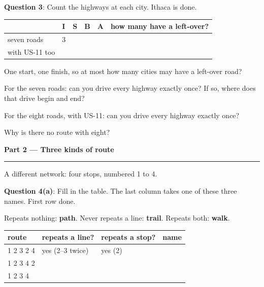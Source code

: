 \documentclass[a4paper, 14pt]{extarticle}
\newcommand{\parthead}[2]{%
  \vspace{0.6em}
  {\large\bfseries Part #1 --- #2}\par
  \vspace{-0.4em}\rule{\textwidth}{0.8pt}\par
  \vspace{0.2em}}
\begin{document}
\begin{minipage}{\textwidth}
\setlength{\parskip}{0.4em}

{\bf Question 3}: Count the highways at each city. Ithaca is done.

\begin{center}
{\setlength{\tabcolsep}{7pt}
\begin{tabular}{|C{3.4cm}|C{1.5cm}|C{1.5cm}|C{1.5cm}|C{1.5cm}|C{3.4cm}|}
\hline
 & \textbf{I} & \textbf{S} & \textbf{B} & \textbf{A} &
\textbf{how many have a left-over?} \\
\hline
seven roads & 3 & & & & \\[0.55cm] \hline
with US-11 too & & & & & \\[0.55cm] \hline
\end{tabular}}
\end{center}

One start, one finish, so at most how many cities may have a left-over road?

For the seven roads: can you drive every highway exactly once? If so, where
does that drive begin and end?

For the eight roads, with US-11: can you drive every highway exactly once?

Why is there no route with eight?

\end{minipage}

\clearpage

\parthead{2}{Three kinds of route}

A different network: four stops, numbered 1 to 4.

\begin{center}
\fournodegraph
\end{center}

\begin{minipage}{\textwidth}
\setlength{\parskip}{0.4em}

{\bf Question 4(a)}: Fill in the table. The last column takes one of these
three names. First row done.

\begin{tcolorbox}[colback=white, boxsep=1pt, top=3pt, bottom=3pt]
Repeats nothing: \textbf{path}. \quad Never repeats a line: \textbf{trail}.
\quad Repeats both: \textbf{walk}.
\end{tcolorbox}

\begin{center}
{\setlength{\tabcolsep}{7pt}
\begin{tabular}{|C{3.4cm}|C{3.6cm}|C{3.4cm}|C{2.6cm}|}
\hline
\textbf{route} & \textbf{repeats a line?} & \textbf{repeats a stop?} &
\textbf{name} \\
 2 3 2 4 & yes (2--3 twice) & yes (2) & \\[0.35cm]  2 3 4 2 & & & \\[0.5cm]  2 3 4 & & & \\[0.5cm] \hline
\end{tabular}}
\end{center}

\end{minipage}
\end{document}
